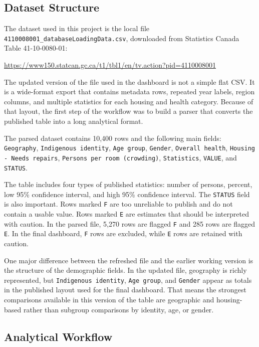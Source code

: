 \documentclass[conference]{IEEEtran}
\begin{document}
\subsection{Dataset Structure}

The dataset used in this project is the local file \texttt{4110008001\_databaseLoadingData.csv}, downloaded from Statistics Canada Table 41-10-0080-01:

\begin{center}
\url{https://www150.statcan.gc.ca/t1/tbl1/en/tv.action?pid=4110008001}
\end{center}

The updated version of the file used in the dashboard is not a simple flat CSV. It is a wide-format export that contains metadata rows, repeated year labels, region columns, and multiple statistics for each housing and health category. Because of that layout, the first step of the workflow was to build a parser that converts the published table into a long analytical format.

The parsed dataset contains 10,400 rows and the following main fields:
\texttt{Geography},
\texttt{Indigenous identity},
\texttt{Age group},
\texttt{Gender},
\texttt{Overall health},
\texttt{Housing - Needs repairs},
\texttt{Persons per room (crowding)},
\texttt{Statistics},
\texttt{VALUE}, and
\texttt{STATUS}.

The table includes four types of published statistics: number of persons, percent, low 95\% confidence interval, and high 95\% confidence interval. The \texttt{STATUS} field is also important. Rows marked \texttt{F} are too unreliable to publish and do not contain a usable value. Rows marked \texttt{E} are estimates that should be interpreted with caution. In the parsed file, 5,270 rows are flagged \texttt{F} and 285 rows are flagged \texttt{E}. In the final dashboard, \texttt{F} rows are excluded, while \texttt{E} rows are retained with caution.

One major difference between the refreshed file and the earlier working version is the structure of the demographic fields. In the updated file, geography is richly represented, but \texttt{Indigenous identity}, \texttt{Age group}, and \texttt{Gender} appear as totals in the published layout used for the final dashboard. That means the strongest comparisons available in this version of the table are geographic and housing-based rather than subgroup comparisons by identity, age, or gender.

\subsection{Analytical Workflow}
\end{document}
